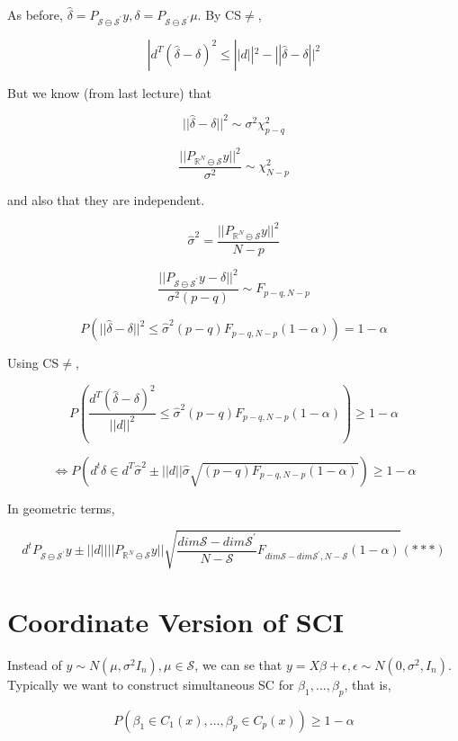 \documentclass[11pt,fleqn]{book} %
\begin{document}
As before, $\hat{\delta} = P_{\mathcal{S} \ominus \mathcal{S}^\prime} y, \delta = P_{\mathcal{S} \ominus \mathcal{S}^\prime}\mu$. By CS$\neq$,

	$$|d^T(\hat{\delta} - \delta)^2 \leq ||d||^2 - || \hat{\delta} - \delta ||^2 $$

But we know (from last lecture) that

		$$||\hat{\delta} - \delta||^2 \sim \sigma^2 \chi^2_{p-q} $$


		$$\frac{||P_{\mathbb{R}^N \ominus \mathcal{S}}y||^2}{\sigma^2} \sim \chi^2_{N-p} $$

and also that they are independent. 

		$$\hat{\sigma}^2 = \frac{||P_{\mathbb{R}^N \ominus \mathcal{S}}y||^2}{N-p} $$

		$$\frac{||P_{\mathcal{S} \ominus \mathcal{S}^\prime}y - \delta||^2}{\sigma^2 (p-q)} \sim F_{p-q, N-p} $$

		$$P\left(||\hat{\delta} - \delta||^2 \leq \hat{\sigma}^2 (p-q) F_{p-q, N-p} (1-\alpha) \right) = 1 - \alpha $$

	Using CS$\neq$,

		$$P \left(\frac{d^T(\hat{\delta} - \delta)^2}{||d||^2} \leq \hat{\sigma}^2 (p-q) F_{p-q, N-p} (1-\alpha) \right) \geq 1-\alpha $$

		$$\Leftrightarrow P(d^t \delta \in d^T \hat{\sigma}^2 \pm || d|| \hat{\sigma} \sqrt{ (p-q) F_{p-q, N-p} (1-\alpha)}) \geq 1 - \alpha$$

In geometric terms, 

	$$d^t P_{\mathcal{S} \ominus \mathcal{S}^\prime}y \pm || d|| ||P_{\mathbb{R}^N \ominus \mathcal{S}}y || \sqrt{\frac{dim \mathcal{S} - dim \mathcal{S}^\prime}{N - \mathcal{S} }F_{dim \mathcal{S} - dim \mathcal{S}^\prime, N - \mathcal{S}} (1-\alpha)}   (***)$$

\section{Coordinate Version of SCI}

Instead of $y \sim N(\mu, \sigma^2 I_n), \mu \in \mathcal{S}$, we can se that $y = X\beta + \epsilon, \epsilon \sim N(0, \sigma^2, I_n)$.\\

Typically we want to construct simultaneous SC for $\beta_1, \dots, \beta_p$, that is,

	$$P(\beta_1 \in C_1(x), \dots, \beta_p \in C_p(x)) \geq 1- \alpha $$
\end{document}
